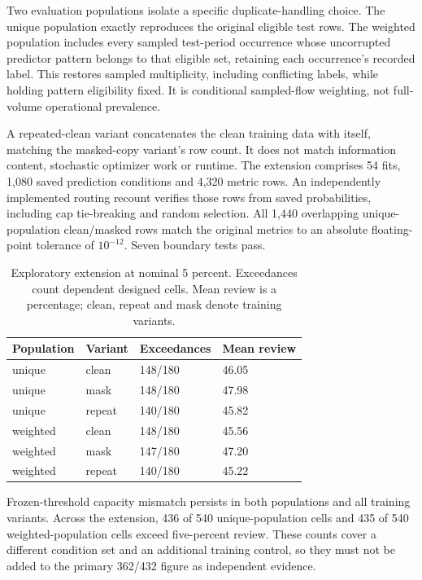 \documentclass[manuscript,screen,nonacm]{acmart}
\begin{document}
Two evaluation populations isolate a specific duplicate-handling choice. The unique population exactly reproduces the original eligible test rows. The weighted population includes every sampled test-period occurrence whose uncorrupted predictor pattern belongs to that eligible set, retaining each occurrence's recorded label. This restores sampled multiplicity, including conflicting labels, while holding pattern eligibility fixed. It is conditional sampled-flow weighting, not full-volume operational prevalence.

A repeated-clean variant concatenates the clean training data with itself, matching the masked-copy variant's row count. It does not match information content, stochastic optimizer work or runtime. The extension comprises 54 fits, 1,080 saved prediction conditions and 4,320 metric rows. An independently implemented routing recount verifies those rows from saved probabilities, including cap tie-breaking and random selection. All 1,440 overlapping unique-population clean/masked rows match the original metrics to an absolute floating-point tolerance of $10^{-12}$. Seven boundary tests pass.

\begin{table}[t]
\centering
\caption{Exploratory extension at nominal 5 percent. Exceedances count dependent designed cells. Mean review is a percentage; clean, repeat and mask denote training variants.}
\begin{tabular}{llll}
\toprule
Population & Variant & Exceedances & Mean review \\
\midrule
unique & clean & 148/180 & 46.05 \\
unique & mask & 148/180 & 47.98 \\
unique & repeat & 140/180 & 45.82 \\
weighted & clean & 148/180 & 45.56 \\
weighted & mask & 147/180 & 47.20 \\
weighted & repeat & 140/180 & 45.22 \\
\bottomrule
\end{tabular}
\end{table}

Frozen-threshold capacity mismatch persists in both populations and all training variants. Across the extension, 436 of 540 unique-population cells and 435 of 540 weighted-population cells exceed five-percent review. These counts cover a different condition set and an additional training control, so they must not be added to the primary 362/432 figure as independent evidence.
\end{document}
